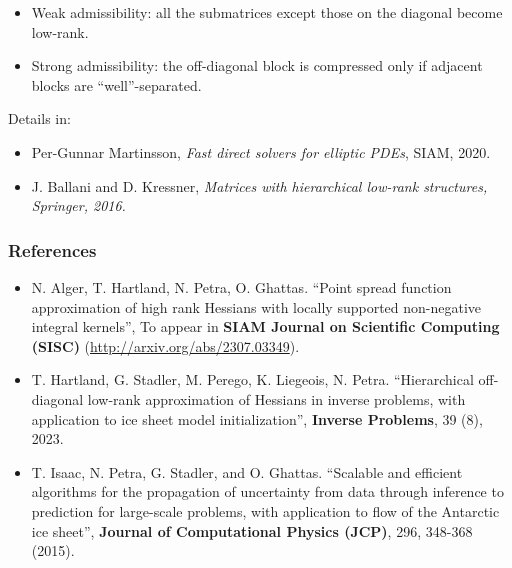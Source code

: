 \documentclass[10pt,final,xcolor=dvipsnames]{beamer}
\begin{document}
\begin{frame}
\begin{itemize}
    \vspace{0.05in}
  \item Weak admissibility: all the submatrices except those on the
    diagonal become low-rank.
  \item Strong admissibility: the off-diagonal block is compressed
    only if adjacent blocks are ``well''-separated.
  \end{itemize}

  \vspace{0.1in}
  \scriptsize
  Details in:
  \begin{itemize}
    \scriptsize
  \item [] Per-Gunnar Martinsson, {\it Fast direct solvers for
    elliptic PDEs}, SIAM, 2020.
  \item [] J. Ballani and D. Kressner, {\it Matrices with hierarchical
    low-rank structures, Springer, 2016.}
  \end{itemize}
\end{frame}
\begin{frame}
  \frametitle{References}

  \begin{itemize}
    \setlength\itemsep{2em}
  \item N. Alger, T. Hartland, N. Petra, O. Ghattas. ``Point spread
    function approximation of high rank Hessians with locally
    supported non-negative integral kernels'', To appear in {\bf SIAM
      Journal on Scientific Computing (SISC)}
    (\url{http://arxiv.org/abs/2307.03349}).

    \item T. Hartland, G. Stadler, M. Perego, K. Liegeois,
      N. Petra. ``Hierarchical off-diagonal low-rank approximation of
      Hessians in inverse problems, with application to ice sheet
      model initialization'', {\bf Inverse Problems}, 39 (8), 2023.

    \item T. Isaac, N. Petra, G. Stadler, and O. Ghattas. ``Scalable
      and efficient algorithms for the propagation of uncertainty from
      data through inference to prediction for large-scale problems,
      with application to flow of the Antarctic ice sheet'', {\bf
        Journal of Computational Physics (JCP)}, 296, 348-368 (2015).
  \end{itemize}

\end{frame}
\end{document}
